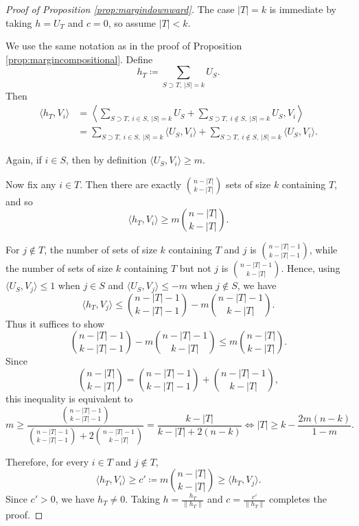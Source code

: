 \documentclass[preprint]{article}
\begin{document}
\begin{proof}[Proof of Proposition \ref{prop:margindownward}]
The case $|T|=k$ is immediate by taking $h=U_T$ and $c=0$, so assume $|T|<k$.

We use the same notation as in the proof of Proposition \ref{prop:margincompositional}. Define
$$
h_T \coloneqq \sum_{S\supset T,\ |S| = k} U_S.
$$
Then
\begin{align*}
\langle h_T, V_i\rangle
&=
\left\langle
\sum_{S\supset T,\ i \in S,\ |S| = k} U_S
+
\sum_{S\supset T,\ i \notin S,\ |S| = k} U_S,
V_i
\right\rangle\\
&=
\sum_{S\supset T,\ i \in S,\ |S| = k} \langle U_S, V_i\rangle
+
\sum_{S\supset T,\ i \notin S,\ |S| = k} \langle U_S, V_i\rangle.
\end{align*}

Again, if $i \in S$, then by definition $\langle U_S, V_i\rangle \geq m$.

Now fix any $i \in T$. Then there are exactly
$\binom{n - |T|}{k - |T|}$ sets of size $k$ containing $T$, and so 
$$
\langle h_T, V_i\rangle \geq m \binom{n - |T|}{k - |T|}.
$$

For $j \notin T$, the number of sets of size $k$ containing $T$ and $j$ is $\binom{n - |T| - 1}{k - |T| - 1}$, while the number of sets of size $k$ containing $T$ but not $j$ is $\binom{n - |T| - 1}{k - |T|}$. Hence, using $\langle U_S,V_j\rangle \leq 1$ when $j\in S$ and $\langle U_S,V_j\rangle \leq -m$ when $j\notin S$, we have
$$
\langle h_T,V_j\rangle
\leq
\binom{n-|T|-1}{k-|T|-1}
-
m\binom{n-|T|-1}{k-|T|}.
$$
Thus it suffices to show
$$
\binom{n-|T|-1}{k-|T|-1}- m\binom{n-|T|-1}{k-|T|}
\leq
m\binom{n-|T|}{k-|T|}.
$$
Since
$$
\binom{n-|T|}{k-|T|} = \binom{n-|T|-1}{k-|T|-1} + \binom{n-|T|-1}{k-|T|},
$$
this inequality is equivalent to
$$
m \geq
    \frac{\binom{n-|T|-1}{k-|T|-1}}
    {\binom{n-|T|-1}{k-|T|-1}+2\binom{n-|T|-1}{k-|T|}}
    =
    \frac{k-|T|}{k-|T|+2(n-k)}
    \iff
    |T| \geq k - \frac{2m(n-k)}{1-m}.
$$

Therefore, for every $i \in T$ and $j \notin T$, 
$$
\langle h_T, V_i\rangle
\geq
c'\coloneqq m \binom{n - |T|}{k - |T|}
\geq
\langle h_T, V_j\rangle.
$$
Since $c'>0$, we have $h_T\neq 0$. Taking $h=\frac{h_T}{\|h_T\|}$ and $c=\frac{c'}{\|h_T\|}
$ completes the proof.
\end{proof}
\end{document}
